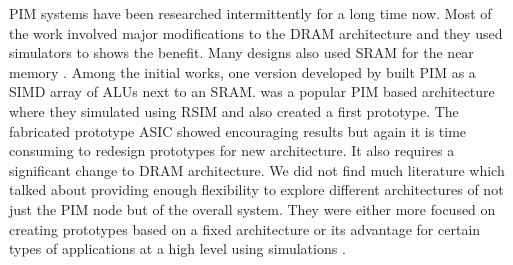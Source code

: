 
PIM systems have been researched intermittently for a long time now. Most of the work involved major modifications to the DRAM architecture and they used simulators to shows the benefit. Many designs also used SRAM for the near memory \cite{diva}. Among the initial works, one version developed by \cite{terasys} built PIM as a SIMD array of ALUs next to an SRAM.
\cite{diva} was a popular PIM based architecture where they simulated using RSIM and also created a first prototype. The fabricated prototype ASIC showed encouraging results but again it is time consuming to redesign prototypes for new architecture. It also requires a significant change to DRAM architecture.
We did not find much literature which talked about providing enough flexibility to explore different architectures of not just the PIM node but of the overall system. They were either more focused on creating prototypes based on a fixed architecture \cite{diva}\cite{flexram}\cite{iram} or its advantage for certain types of applications at a high level using simulations \cite{multimedia_fpga}\cite{sram_based_simulation}\cite{blast}.


